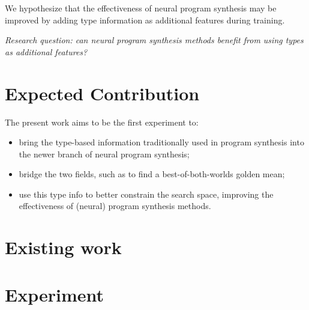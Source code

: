 \documentclass{article}
\begin{document}
We hypothesize that the effectiveness of neural program synthesis may be improved by 
adding type information as additional features during training.



\emph{Research question: can neural program synthesis methods benefit from using types as additional features?}

\section{Expected Contribution}

The present work aims to be the first experiment to:
\begin{itemize}
    \item bring the type-based information traditionally used in program synthesis into the newer branch of neural program synthesis;
    \item bridge the two fields, such as to find a best-of-both-worlds golden mean;
    \item use this type info to better constrain the search space, improving the effectiveness of (neural) program synthesis methods. 
\end{itemize}

\section{Existing work}



\section{Experiment}

\end{document}
